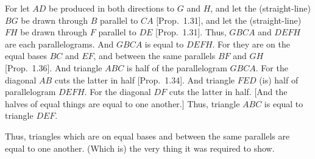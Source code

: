 \begin{Parallel}{}{}
{For let $AD$ be produced in both directions to $G$ and $H$, and
let the (straight-line) $BG$ be drawn through $B$ parallel to $CA$ [Prop.~1.31], and let the (straight-line) $FH$ be drawn through
$F$ parallel to $DE$ [Prop.~1.31]. Thus,  $GBCA$ and $DEFH$ are
each parallelograms. And $GBCA$ is equal to $DEFH$.
For they are on the equal bases $BC$ and $EF$, and between  the same
parallels $BF$ and $GH$ [Prop.~1.36]. And triangle $ABC$ is half of the parallelogram
$GBCA$. For the diagonal $AB$ cuts the latter in half [Prop.~1.34]. And
triangle $FED$ (is) half of parallelogram $DEFH$. For the diagonal $DF$ cuts
the latter in half. [And the halves of equal things are equal to one another.] Thus,
triangle $ABC$ is equal to triangle $DEF$.

Thus, triangles which are on equal bases and between the same parallels
are equal to one another. (Which is) the very thing it was required to show.}
\end{Parallel}


